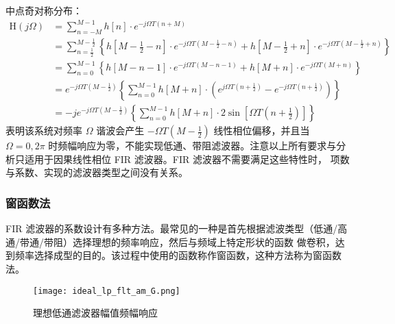 \begin{itemize}
          中点奇对称分布：
          \begin{align*}
              \mathrm{H}(j \Omega) & =\sum_{n=-M}^{M-1} h[n] \cdot e^{-j \Omega T(n+M)} \\
                                   & =\sum_{n=\frac{1}{2}}^{M-\frac{1}{2}}
              \left\{
              h[M-\frac{1}{2}-n] \cdot e^{-j \Omega T(M-\frac{1}{2}-n)}+
              h[M-\frac{1}{2}+n] \cdot e^{-j \Omega T(M-\frac{1}{2}+n)}
              \right\}                                                                  \\
                                   & =\sum_{n=0}^{M-1}
              \left\{
              h[M-n-1] \cdot e^{-j \Omega T(M-n-1)}+ h[M+n] \cdot e^{-j \Omega T(M+n)}
              \right\}                                                                  \\
                                   & =e^{-j \Omega T (M-\frac{1}{2})}
              \left\{
              \sum_{n=0}^{M-1} h[M+n] \cdot\left(e^{j \Omega T(n+\frac{1}{2})}-e^{-j \Omega T(n+\frac{1}{2})}\right)
              \right\}                                                                  \\
                                   & =-je^{-j \Omega T (M-\frac{1}{2})}
              \left\{
              \sum_{n=0}^{M-1} h[M+n] \cdot 2 \sin \left[\Omega T (n+\frac{1}{2})\right]
              \right\}
          \end{align*}
          表明该系统对频率 $\Omega$ 谐波会产生 $-\Omega T(M-\frac{1}{2})$ 线性相位偏移，并且当 $\Omega=0,2\pi$
          时频幅响应为零，不能实现低通、带阻滤波器。注意以上所有要求与分析只适用于因果线性相位 FIR 滤波器。FIR 滤波器不需要满足这些特性时，
          项数与系数、实现的滤波器类型之间没有关系。
\end{itemize}

\subsubsection{窗函数法}

FIR 滤波器的系数设计有多种方法。最常见的一种是首先根据滤波类型（低通/高通/带通/带阻）选择理想的频率响应，然后与频域上特定形状的函数
做卷积，达到频率选择成型的目的。该过程中使用的函数称作窗函数，这种方法称为窗函数法。
\begin{figure}[htbp]
    \centering\label{ideal_lp_g_resp}
    \texttt{[image: ideal\_lp\_flt\_am\_G.png]}
    \caption{理想低通滤波器幅值频幅响应}
\end{figure}

